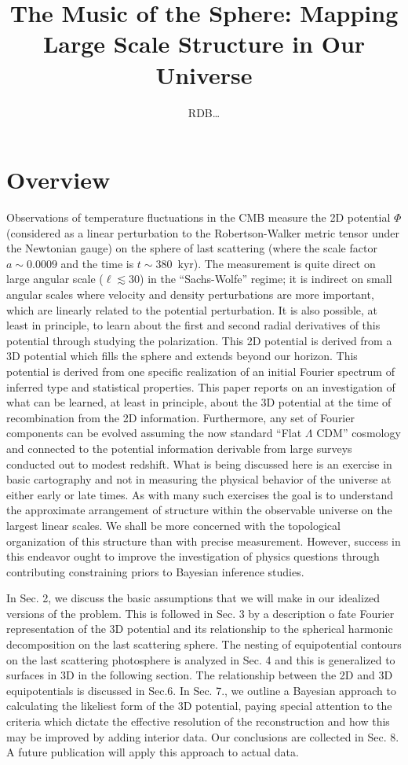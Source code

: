 \documentclass[12pt]{article}
\title{The Music of the Sphere: Mapping Large Scale Structure in Our Universe }
\author{RDB\dots}
\begin{document}
\maketitle
\section{Overview}
Observations of temperature fluctuations in the CMB measure the 2D potential $\Phi$ (considered as a linear perturbation to the Robertson-Walker metric tensor under the Newtonian gauge) on the sphere of last scattering (where the scale factor $a\sim0.0009$ and the time is $t\sim380$~kyr). The measurement is quite direct on large angular scale ($\ell\lesssim30$) in the ``Sachs-Wolfe'' regime; it is indirect on small angular scales where velocity and density perturbations are more important, which are linearly related to the potential perturbation. It is also possible, at least in principle, to learn about the first and second radial derivatives of this potential through studying the polarization. This 2D potential is derived from a 3D potential which fills the sphere and extends beyond our horizon. This potential is derived from one specific realization of an initial Fourier spectrum of inferred type and statistical properties.  This paper reports on an investigation of what can be learned, at least in principle, about the 3D potential at the time of recombination from the 2D information. Furthermore, any set of Fourier components can be evolved assuming the now standard ``Flat $\Lambda$ CDM'' cosmology and connected to the potential information derivable from large surveys conducted out to modest redshift. What is being discussed here is an exercise in basic cartography and not in measuring the physical behavior of the universe at either early or late times. As with many such exercises the goal is to understand the approximate arrangement of structure within the observable universe on the largest linear scales. We shall be more concerned with the topological organization of this structure than with precise measurement. However, success in this endeavor ought to improve the investigation of physics questions through contributing constraining priors to Bayesian inference studies.

In Sec. 2, we discuss the basic assumptions that we will make in our idealized versions of the problem. This is followed in Sec. 3 by a description o fate Fourier representation of the 3D potential and its relationship to the spherical harmonic decomposition on the last scattering sphere. The nesting of equipotential contours on the last scattering photosphere is analyzed in Sec. 4 and this is generalized to surfaces in 3D in the following section.  The relationship between the 2D and 3D equipotentials is discussed in Sec.6. In Sec. 7., we outline a Bayesian approach to calculating the likeliest form of the 3D potential, paying special attention to the criteria which dictate the effective resolution of the reconstruction and how this may be improved by adding interior data. Our conclusions are collected in Sec. 8. A future publication will apply this approach to actual data. 
\end{document}
